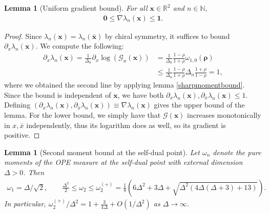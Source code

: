 \documentclass[a4paper,11pt]{article}
\theoremstyle{plain}
\newtheorem{lem}[thm]{Lemma}
\theoremstyle{definition}
\theoremstyle{remark}
\newcommand{\bs}[1]{\boldsymbol{#1}}
\newcommand{\ba}{\begin{equation} \begin{aligned}}
\newcommand{\ea}{\end{aligned} \end{equation}}
\newcommand{\De}{\Delta}
\begin{document}
\begin{appendix}
\begin{lem}[Uniform gradient bound]
\label{uniformgradbound}
For all $\bs{x} \in \mathbb{R}^2$ and $n \in \mathbb{N}$,
\ba
\bs{0}\leq \nabla\lambda_n(\bs{x}) \leq \bs{1} .
\ea
\end{lem}
\begin{proof}
Since $\lambda_n(\bs{x}) = \lambda_n(\bar{\bs{x}})$ by chiral symmetry, it suffices to bound $\partial_x \lambda_n(\bs{x})$. We compute the following:
\ba
\partial_x \lambda_n(\bs{x}) = \frac{1}{\De_n} \partial_x \log(\mathcal{G}_n(\bs{x})) &= \frac{1}{\De_n} \frac{1- \rho}{1+\rho} \omega_{1,0}(\bs{\rho})\\
&\leq \frac{1}{\De_n} \frac{1- \rho}{1+\rho} \De_n \frac{1+\rho}{1-\rho} = 1,
\ea
where we obtained the second line by applying lemma \ref{sharpmomentbound}. Since the bound is independent of $\bs{x}$, we have both $ \partial_{x} \lambda_n(\bs{x}) , \partial_{\bar{x}} \lambda_n(\bs{x}) \leq 1$. Defining $\left(\partial_{x} \lambda_n(\bs{x}) , \partial_{\bar{x}} \lambda_n(\bs{x})  \right) \equiv \nabla\lambda_n(\bs{x})$  gives the upper bound of the lemma. For the lower bound, we simply have that $\mathcal{G}(\bs{x})$ increases monotonically in $x,\bar{x}$ independently, thus its logarithm does as well, so its gradient is positive. 
\end{proof}

\begin{lem}[Second moment bound at the self-dual point]
\label{sdmomentbounds}
Let $\omega_n$ denote the pure moments of the OPE measure at the self-dual point with external dimension $\De > 0$. Then
\ba
\omega_1 = \De/\sqrt{2}, \qquad \frac{\De^2}{2}\leq \omega_2 \leq \omega_2^{(+)} = \frac{1}{8}\left(6\De^2 + 3\De + \sqrt{\De^2(4\De(\De+3)+13)}\right).
\ea
In particular, $\omega_2^{(+)}/\De^2 = 1 + \frac{3}{4\De} + O(1/\De^2)$ as $\De \to \infty$.
\end{lem}
 

\end{appendix}
\end{document}
